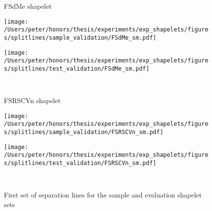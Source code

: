 \begin{figure}[ht!]
\begin{minipage}[c]{\textwidth}
		\begin{minipage}[c]{\textwidth}
			\begin{minipage}[c]{0.15\textwidth}
				\centering
				FSdMe shapelet
			\end{minipage}
			\begin{minipage}[c]{0.40\textwidth}	
			\centering
			\texttt{[image: /Users/peter/honors/thesis/experiments/exp\_shapelets/figures/splitlines/sample\_validation/FSdMe\_sm.pdf]}
			\end{minipage}
			\begin{minipage}[c]{0.40\textwidth}
				\centering
				\texttt{[image: /Users/peter/honors/thesis/experiments/exp\_shapelets/figures/splitlines/test\_validation/FSdMe\_sm.pdf]}
			\end{minipage}
		\end{minipage} \\
	
		\begin{minipage}[c]{\textwidth}
			\begin{minipage}[c]{0.15\textwidth}
				\centering
				FSRSCVn shapelet
			\end{minipage}
			\begin{minipage}[c]{0.40\textwidth}	
				\centering
			\texttt{[image: /Users/peter/honors/thesis/experiments/exp\_shapelets/figures/splitlines/sample\_validation/FSRSCVn\_sm.pdf]}
			\end{minipage}
			\begin{minipage}[c]{0.40\textwidth}
				\centering
				\texttt{[image: /Users/peter/honors/thesis/experiments/exp\_shapelets/figures/splitlines/test\_validation/FSRSCVn\_sm.pdf]}
			\end{minipage}
		\end{minipage} \\
	\end{minipage}
	\caption{First set of separation lines for the sample and evaluation shapelet sets}
	\end{figure}
\newpage

